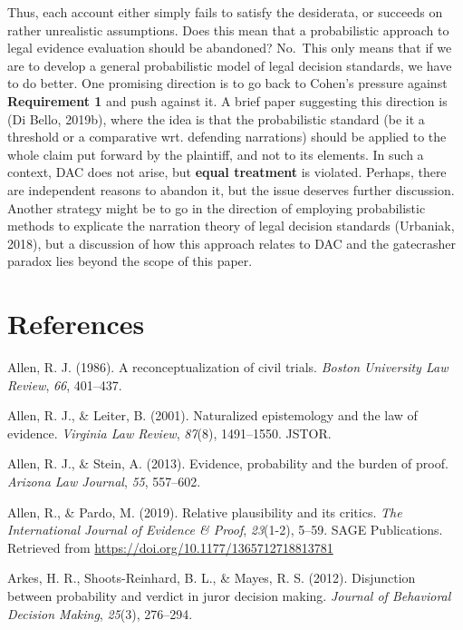 \documentclass[10pt,dvipsnames,enabledeprecatedfontcommands]{scrartcl}
\begin{document}
Thus, each account either simply fails to satisfy the desiderata, or
succeeds on rather unrealistic assumptions. Does this mean that a
probabilistic approach to legal evidence evaluation should be abandoned?
No.~This only means that if we are to develop a general probabilistic
model of legal decision standards, we have to do better. One promising
direction is to go back to Cohen's pressure against
\textbf{Requirement 1} and push against it. A brief paper suggesting
this direction is (Di Bello, 2019b), where the idea is that the
probabilistic standard (be it a threshold or a comparative wrt.
defending narrations) should be applied to the whole claim put forward
by the plaintiff, and not to its elements. In such a context, DAC does
not arise, but \textbf{equal treatment} is violated. Perhaps, there are
independent reasons to abandon it, but the issue deserves further
discussion. Another strategy might be to go in the direction of
employing probabilistic methods to explicate the narration theory of
legal decision standards (Urbaniak, 2018), but a discussion of how this
approach relates to DAC and the gatecrasher paradox lies beyond the
scope of this paper.

\hypertarget{references}{%
\section*{References}\label{references}}

\hypertarget{refs}{}
\leavevmode\hypertarget{ref-Allen1986A-Reconceptuali}{}%
Allen, R. J. (1986). A reconceptualization of civil trials. \emph{Boston
University Law Review}, \emph{66}, 401--437.

\leavevmode\hypertarget{ref-allen2001naturalized}{}%
Allen, R. J., \& Leiter, B. (2001). Naturalized epistemology and the law
of evidence. \emph{Virginia Law Review}, \emph{87}(8), 1491--1550.
JSTOR.

\leavevmode\hypertarget{ref-allen2013}{}%
Allen, R. J., \& Stein, A. (2013). Evidence, probability and the burden
of proof. \emph{Arizona Law Journal}, \emph{55}, 557--602.

\leavevmode\hypertarget{ref-AllenPardo2019relative}{}%
Allen, R., \& Pardo, M. (2019). Relative plausibility and its critics.
\emph{The International Journal of Evidence \& Proof}, \emph{23}(1-2),
5--59. SAGE Publications. Retrieved from
\url{https://doi.org/10.1177/1365712718813781}

\leavevmode\hypertarget{ref-arkesEtAl2012}{}%
Arkes, H. R., Shoots-Reinhard, B. L., \& Mayes, R. S. (2012).
Disjunction between probability and verdict in juror decision making.
\emph{Journal of Behavioral Decision Making}, \emph{25}(3), 276--294.
\end{document}
